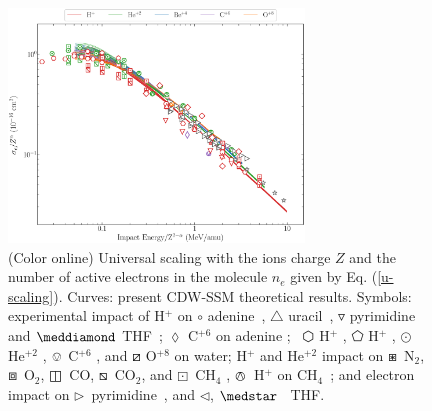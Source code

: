\documentclass[10pt,showpacs,showkeys,twocolumn]{revtex4}
\begin{document}
\begin{figure}[!t]%
\centering
\includegraphics[width=0.7\textwidth]{zmol_alpha.eps}
\caption{(Color online) Universal scaling with the ions charge $Z$ and the number of active electrons in the molecule $n_e$ given by Eq. (\ref{u-scaling}). Curves: present CDW-SSM theoretical results. 
Symbols: experimental impact of H$^+$ on 
\mbox{\Large$\circ$} adenine~\cite{iriki2011}, 
$\triangle$ uracil~\cite{itoh2013}, 
$\triangledown$ pyrimidine~\cite{wolff2014} and 
$\meddiamond$ THF~\cite{wang2016};
$\lozenge$ C$^{+6}$ on adenine \cite{tribedi2019};
\mbox{\fontsize{10}{20} $\varhexagon$} H$^+$ \cite{Luna2007},
$\pentagon$ H$^+$ \cite{Rudd86}, 
$\odot$ He$^{+2}$ \cite{Rudd85},  
$\ovee$ C$^{+6}$ \cite{DalCappello2009}, and 
$\boxslash$ O$^{+8}$ \cite{Tribedi_O_water} on water;
H$^{+}$ and He$^{+2}$ impact on 
$\boxast$~N$_2$, 
$\boxbox$~O$_2$,
$\boxbar$~CO, 
$\boxbslash$~CO$_2$, and
$\boxdot$~CH$_4$ \cite{Rudd85,Rudd1983}, 
$\varowedge$~H$^{+}$ on CH$_4$~\cite{Luna2019}; 
and electron impact on $\rhd$~pyrimidine~\cite{bug2017}, and $\lhd$, $\medstar$~\cite{wolf2019,fuss2009} THF.}
\label{fig:zalpha}
\end{figure} 
\end{document}
